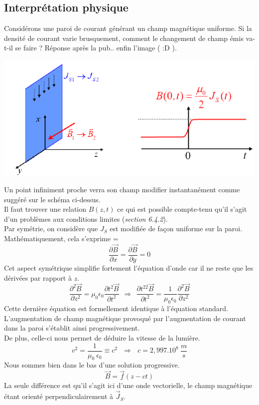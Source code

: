 \documentclass	[11pt, a4paper, openany]{book}
\begin{document}
\subsection{Interprétation physique}
Considérons une paroi de courant générant un champ magnétique uniforme. Si la densité de courant varie brusquement, comment le changement de champ émis va-t-il se faire ? Réponse après la pub.. enfin l'image ( :D ).
\begin{center}
\includegraphics[scale=0.4]{oo/image32.png}
\end{center}
Un point infiniment proche verra son champ modifier instantanément comme suggéré sur le schéma ci-dessus.\\
Il faut trouver une relation $B(z,t)$ ce qui est possible compte-tenu qu'il s'agit d'un problèmes aux conditions limites (\textit{section 6.4.2}).\\

Par symétrie, on considère que $J_S$ est modifiée de façon uniforme sur la paroi. Mathématiquement, cela s'exprime =
\begin{equation}
\frac{\partial\vec{B}}{\partial x} = \frac{\partial \vec{B}}{\partial y} = 0
\end{equation}
Cet aspect symétrique simplifie fortement l'équation d'onde car il ne reste que les dérivées par rapport à $z$.
\begin{equation}
\frac{\partial^2\vec{B}}{\partial z^2} = \mu_0\epsilon_0\frac{\partial t^2\vec{B}}{\partial t^2}\ \ \Rightarrow\ \ \frac{\partial t^22\vec{B}}{\partial t^2}  = \frac{1}{\mu_0\epsilon_0}\frac{\partial^2\vec{B}}{\partial z^2}
\end{equation}
Cette dernière équation est formellement identique à l'équation standard. L'augmentation de champ magnétique provoqué par l'augmentation de courant dans la paroi s'établit ainsi progressivement.\\
De plus, celle-ci nous permet de déduire la vitesse de la lumière.
\begin{equation}
v^2 = \frac{1}{\mu_0\ \epsilon_0} \equiv c^2\ \ \ \Rightarrow\ \ \ c = 2,997.10^8\ \frac{m}{s}
\end{equation}
Nous sommes bien dans le bas d'une solution progressive.
\begin{equation}
\vec{B} = \vec{f}(z - ct)
\end{equation}
La seule différence est qu'il s'agit ici d'une onde vectorielle, le champ magnétique étant orienté perpendiculairement à $\vec{J}_S$.\\
\end{document}
